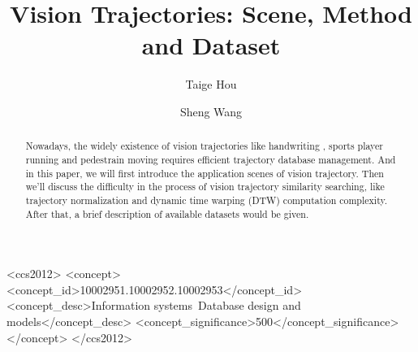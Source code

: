 \documentclass[sigconf]{acmart}
\begin{document}
\title{Vision Trajectories: Scene, Method and Dataset}




\author{Taige Hou}

\author{Sheng Wang}


\begin{abstract}
Nowadays, the widely existence of vision trajectories like handwriting \cite{VikramLR13}, sports player running \cite{DBLP:conf/kdd/WangLCJ19} and pedestrain moving \cite{GuptaJFSA18} requires efficient trajectory  database management. And in this paper, we will first introduce the application scenes of vision trajectory. Then we'll discuss the difficulty in the process of vision trajectory similarity searching, like trajectory normalization and dynamic time warping (DTW) computation complexity. After that, a brief description of available datasets would be given. 
\end{abstract}

\begin{CCSXML}
	<ccs2012>
	<concept>
	<concept_id>10002951.10002952.10002953</concept_id>
	<concept_desc>Information systems~Database design and models</concept_desc>
	<concept_significance>500</concept_significance>
	</concept>
	</ccs2012>
\end{CCSXML}

\end{document}

